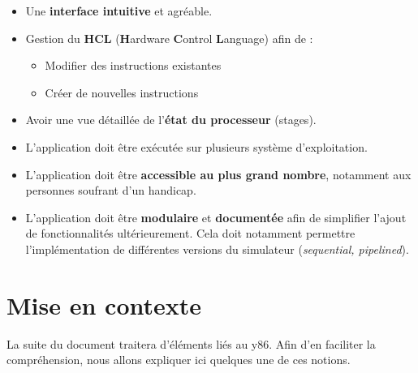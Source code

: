 \documentclass[french]{article}
\begin{document}
\begin{itemize}
    \item Une \textbf{interface intuitive} et agréable.
    \item Gestion du \textbf{HCL} (\textbf{H}ardware \textbf{C}ontrol \textbf{L}anguage) afin de :
    \begin{itemize}
        \item Modifier des instructions existantes
        \item Créer de nouvelles instructions
    \end{itemize}{}
    \item Avoir une vue détaillée de l'\textbf{état du processeur} (stages).
    \item L'application doit être  exécutée sur plusieurs système d'exploitation.
    \item L'application doit être \textbf{accessible au plus grand nombre}, notamment aux personnes soufrant d'un handicap.
    \item L'application doit être \textbf{modulaire} et \textbf{documentée} afin de simplifier l'ajout de fonctionnalités ultérieurement. Cela doit notamment permettre l'implémentation de différentes versions du simulateur (\textit{sequential, pipelined}).
\end{itemize}

\section{Mise en contexte}
\label{contexte}

La suite du document traitera d'éléments liés au y86. Afin d'en faciliter la compréhension, nous allons expliquer ici quelques une de ces notions.
\end{document}
